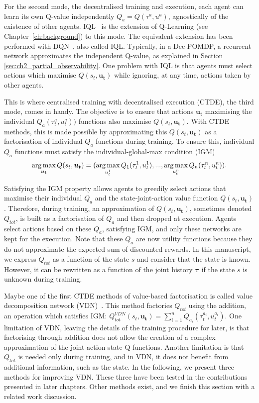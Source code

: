 For the second mode, the decentralised training and execution, each agent can learn its own Q-value independently $Q_a=Q(\tau^a, u^a)$, agnostically of the existence of other agents.
IQL~\citep{Tan1993} is the extension of Q-Learning (see Chapter~\ref{ch:background}) to this mode. 
The equivalent extension has been performed with DQN~\citep{TampuuDqnIQL}, also called IQL.
Typically, in a Dec-POMDP, a recurrent network approximates the independent Q-value, as explained in Section \ref{sec:ch2_partial_observability}.
One problem with IQL is that agents must select actions which maximise $Q(s_t, \mathbf{u_t})$ while ignoring, at any time, actions taken by other agents.

This is where centralised training with decentralised execution (CTDE), the third mode, comes in handy.
The objective is to ensure that actions $\mathbf{u_t}$ maximising the individual $Q_a(\tau_t^a, u_t^a))$ functions also maximise $Q(s_t, \mathbf{u_t})$.
With CTDE methods, this is made possible by approximating this $Q(s_t, \mathbf{u_t})$ as a factorisation of individual $Q_a$ functions during training.
To ensure this, individual $Q_a$ functions must satisfy the individual-global-max condition (IGM)~\citep{Son2019QTRAN:Learning}
\begin{equation}
    \argmax_{\mathbf{u_t}} Q(s_t, \mathbf{u_t}) =(\argmax_{u_t^{1}} Q_{1}(\tau_t^{1}, u_t^{1}),...,\argmax_{u_t^{n}} Q_{n}(\tau_t^{n}, u_t^{n})).
    \label{eq:ch3_igm}
\end{equation}

Satisfying the IGM property allows agents to greedily select actions that maximise their individual $Q_a$ and the state-joint-action value function $Q(s_t, \mathbf{u_t})$.
Therefore, during training, an approximation of $Q(s_t, \mathbf{u_t})$, sometimes denoted $Q_{tot}$, is built as a factorisation of $Q_a$ and then dropped at execution.
Agents select actions based on these $Q_a$, satisfying IGM, and only these networks are kept for the execution.
Note that these $Q_a$ are now utility functions because they do not approximate the expected sum of discounted rewards.
In this manuscript, we express $Q_{tot}$ as a function of the state $s$ and consider that the state is known.
However, it can be rewritten as a function of the joint history $\mathbf{\tau}$ if the state $s$ is unknown during training.

Maybe one of the first CTDE methods of value-based factorisation is called value decomposition network (VDN)~\citep{sunehag2018vdn}.
This method factories $Q_{tot}$ using the addition, an operation which satisfies IGM: $Q_{tot}^{VDN}(s_t, \mathbf{u_t}) = \sum_{i=1}^n Q_{a_i}(\tau^{a_i}_t, u^{a_i}_t)$.
One limitation of VDN, leaving the details of the training procedure for later, is that factorising through addition does not allow the creation of a complex approximation of the joint-action-state Q functions.
Another limitation is that $Q_{tot}$ is needed only during training, and in VDN, it does not benefit from additional information, such as the state.
In the following, we present three methods for improving VDN.
These three have been tested in the contributions presented in later chapters.
Other methods exist, and we finish this section with a related work discussion.

